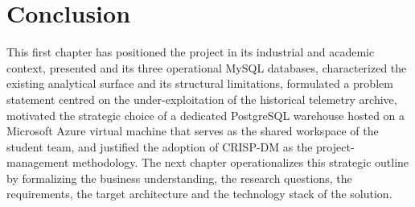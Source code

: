 \section{Conclusion}
This first chapter has positioned the project in its industrial and academic context, presented \hostorg{} and its three operational MySQL databases, characterized the existing analytical surface and its structural limitations, formulated a problem statement centred on the under-exploitation of the historical telemetry archive, motivated the strategic choice of a dedicated PostgreSQL warehouse hosted on a Microsoft Azure virtual machine that serves as the shared workspace of the student team, and justified the adoption of CRISP-DM as the project-management methodology. The next chapter operationalizes this strategic outline by formalizing the business understanding, the research questions, the requirements, the target architecture and the technology stack of the solution.
